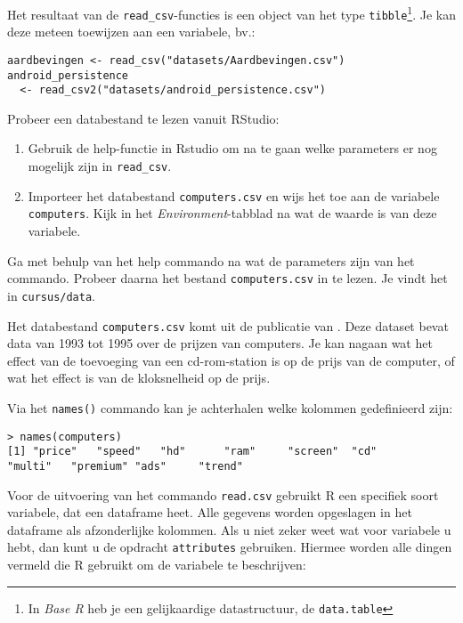 Het resultaat van de \texttt{read\_csv}-functies is een object van het type \texttt{tibble}\footnote{In \textit{Base R} heb je een gelijkaardige datastructuur, de \texttt{data.table}}. Je kan deze meteen toewijzen aan een variabele, bv.:

\begin{lstlisting}
aardbevingen <- read_csv("datasets/Aardbevingen.csv")
android_persistence
  <- read_csv2("datasets/android_persistence.csv")
\end{lstlisting}

\begin{exercise}
  Probeer een databestand te lezen vanuit RStudio:
  
  \begin{enumerate}
    \item Gebruik de help-functie in Rstudio om na te gaan welke parameters er nog mogelijk zijn in \texttt{read\_csv}.
    \item Importeer het databestand \texttt{computers.csv} en wijs het toe aan de variabele \texttt{computers}. Kijk in het \textit{Environment}-tabblad na wat de waarde is van deze variabele.
  \end{enumerate}
  
Ga met behulp van het help commando na wat de parameters zijn van het commando. Probeer daarna het bestand \texttt{computers.csv} in te lezen. Je vindt het in \texttt{cursus/data}.
\end{exercise}

Het databestand \texttt{computers.csv} komt uit de publicatie van \autocite{Stengos2005}. Deze dataset bevat data van 1993 tot 1995 over de prijzen van computers. Je kan nagaan wat het effect van de toevoeging van een cd-rom-station is op de prijs van de computer, of wat het effect is van de kloksnelheid op de prijs. 

Via het \texttt{names()} commando kan je achterhalen welke kolommen gedefinieerd zijn:

\begin{lstlisting}[breaklines=true]
> names(computers)
[1] "price"   "speed"   "hd"      "ram"     "screen"  "cd"      "multi"   "premium" "ads"     "trend"
\end{lstlisting}

Voor de uitvoering van het commando \texttt{read.csv} gebruikt R een specifiek soort variabele, dat een dataframe heet. Alle gegevens worden opgeslagen in het dataframe als afzonderlijke kolommen. Als u niet zeker weet wat voor variabele u hebt, dan kunt u de opdracht \texttt{attributes} gebruiken. Hiermee worden alle dingen vermeld die R gebruikt om de variabele te beschrijven:

